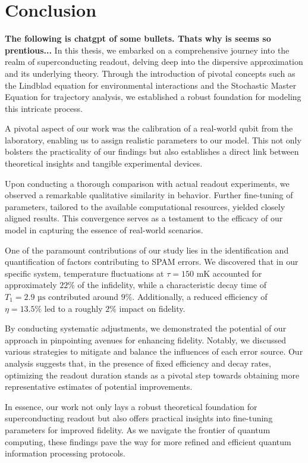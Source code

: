 \chapter{Conclusion}
\textbf{The following is chatgpt of some bullets. Thats why is seems so prentious...}
In this thesis, we embarked on a comprehensive journey into the realm of superconducting readout, delving deep into the dispersive approximation and its underlying theory. Through the introduction of pivotal concepts such as the Lindblad equation for environmental interactions and the Stochastic Master Equation for trajectory analysis, we established a robust foundation for modeling this intricate process.

A pivotal aspect of our work was the calibration of a real-world qubit from the laboratory, enabling us to assign realistic parameters to our model. This not only bolsters the practicality of our findings but also establishes a direct link between theoretical insights and tangible experimental devices.

Upon conducting a thorough comparison with actual readout experiments, we observed a remarkable qualitative similarity in behavior. Further fine-tuning of parameters, tailored to the available computational resources, yielded closely aligned results. This convergence serves as a testament to the efficacy of our model in capturing the essence of real-world scenarios.

One of the paramount contributions of our study lies in the identification and quantification of factors contributing to SPAM errors. We discovered that in our specific system, temperature fluctuations at $\tau = 150 \text{ mK}$ accounted for approximately $22\%$ of the infidelity, while a characteristic decay time of $T_1 = 2.9 \text{ µs}$ contributed around $9\%$. Additionally, a reduced efficiency of $\eta = 13.5 \%$ led to a roughly $2\%$ impact on fidelity.

By conducting systematic adjustments, we demonstrated the potential of our approach in pinpointing avenues for enhancing fidelity. Notably, we discussed various strategies to mitigate and balance the influences of each error source. Our analysis suggests that, in the presence of fixed efficiency and decay rates, optimizing the readout duration stands as a pivotal step towards obtaining more representative estimates of potential improvements.

In essence, our work not only lays a robust theoretical foundation for superconducting readout but also offers practical insights into fine-tuning parameters for improved fidelity. As we navigate the frontier of quantum computing, these findings pave the way for more refined and efficient quantum information processing protocols.

